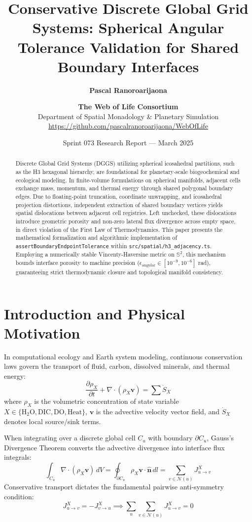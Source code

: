 \documentclass[11pt,a4paper]{article}
\title{\textbf{Conservative Discrete Global Grid Systems: Spherical Angular Tolerance Validation for Shared Boundary Interfaces}}
\author{\textbf{Pascal Ranoroarijaona} \and \textbf{The Web of Life Consortium} \\
\small Department of Spatial Monadology \& Planetary Simulation \\
\small \url{https://github.com/pascalranoroarijaona/WebOfLife}}
\date{Sprint 073 Research Report --- March 2025}
\begin{document}
\maketitle

\begin{abstract}
Discrete Global Grid Systems (DGGS) utilizing spherical icosahedral partitions, such as the H3 hexagonal hierarchy, are foundational for planetary-scale biogeochemical and ecological modeling. In finite-volume formulations on spherical manifolds, adjacent cells exchange mass, momentum, and thermal energy through shared polygonal boundary edges. Due to floating-point truncation, coordinate unwrapping, and icosahedral projection distortions, independent extraction of shared boundary vertices yields spatial dislocations between adjacent cell registries. Left unchecked, these dislocations introduce geometric porosity and non-zero lateral flux divergence across empty space, in direct violation of the First Law of Thermodynamics. This paper presents the mathematical formalization and algorithmic implementation of \texttt{assertBoundaryEndpointTolerance} within \texttt{src/spatial/h3\_adjacency.ts}. Employing a numerically stable Vincenty-Haversine metric on $\mathbb{S}^2$, this mechanism bounds interface porosity to machine precision ($\epsilon_{\text{angular}} \in [10^{-9}, 10^{-6}]$ rad), guaranteeing strict thermodynamic closure and topological manifold consistency.
\end{abstract}

\section{Introduction and Physical Motivation}

In computational ecology and Earth system modeling, continuous conservation laws govern the transport of fluid, carbon, dissolved minerals, and thermal energy:
\begin{equation}
\frac{\partial \rho_X}{\partial t} + \nabla \cdot (\rho_X \mathbf{v}) = \sum \dot{S}_X
\end{equation}
where $\rho_X$ is the volumetric concentration of state variable $X \in \{\text{H}_2\text{O}, \text{DIC}, \text{DO}, \text{Heat}\}$, $\mathbf{v}$ is the advective velocity vector field, and $\dot{S}_X$ denotes local source/sink terms.

When integrating over a discrete global cell $C_u$ with boundary $\partial C_u$, Gauss's Divergence Theorem converts the advective divergence into interface flux integrals:
\begin{equation}
\int_{C_u} \nabla \cdot (\rho_X \mathbf{v}) \, dV = \oint_{\partial C_u} \rho_X \mathbf{v} \cdot \hat{\mathbf{n}} \, dl = \sum_{v \in \mathcal{N}(u)} J_{u \to v}^X
\end{equation}
Conservative transport dictates the fundamental pairwise anti-symmetry condition:
\begin{equation}
J_{u \to v}^X = -J_{v \to u}^X \implies \sum_{u} \sum_{v \in \mathcal{N}(u)} J_{u \to v}^X = 0
\end{equation}
\end{document}
